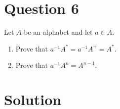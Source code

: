 \section{Question 6}

Let $A$ be an alphabet and let $a \in A$.

\begin{enumerate}[label=(\alph*)]

	\item
	Prove that $a^{-1}A^* = a^{-1}A^+ = A^*$.

	\item
	Prove that $a^{-1}A^n = A^{n-1}$.

\end{enumerate}

\section*{Solution}

